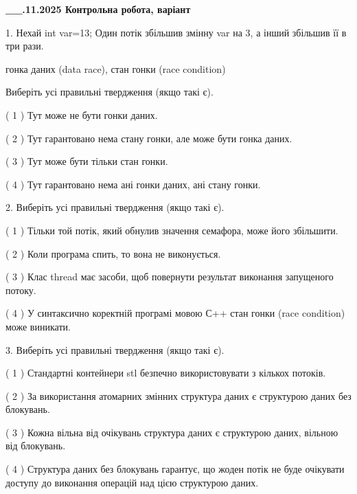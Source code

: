 \documentclass[12pt, ukrainian]{article}
\begin{document}
\newpage
\begin {large}

\textbf{\_\_.11.2025 Контрольна робота, варіант  }\par


{
1. Нехай int var=13; Один потік збільшив змінну var на 3, а інший збільшив її в три рази.

гонка даних (data race), стан гонки (race condition)

Виберіть усі правильні твердження (якщо такі є).\par
\vspace{2mm}
( 1 ) Тут може не бути гонки даних.%

( 2 ) Тут гарантовано нема стану гонки, але може бути гонка даних.%

( 3 ) Тут може бути тільки стан гонки.%

( 4 ) Тут гарантовано нема ані гонки даних, ані стану гонки.%


2. Виберіть усі правильні твердження (якщо такі є).\par
\vspace{2mm}

( 1 ) Тільки той потік, який обнулив значення семафора, може його збільшити.%

( 2 ) Коли програма спить, то вона не виконується.%

( 3 ) Клас thread має засоби, щоб повернути результат виконання запущеного потоку.%

( 4 ) У синтаксично коректній програмі мовою С++ стан гонки (race condition) може виникати.%


3. Виберіть усі правильні твердження (якщо такі є).\par
\vspace{2mm}

( 1 ) Стандартні контейнери stl безпечно використовувати з кількох потоків.%

( 2 ) За використання атомарних змінних структура даних є структурою даних без блокувань.%

( 3 ) Кожна вільна від очікувань структура даних є структурою даних, вільною від блокувань.%

( 4 ) Структура даних без блокувань гарантує, що жоден потік не буде очікувати доступу до виконання операцій над цією структурою даних.%


}
\end{large}
\end{document}
